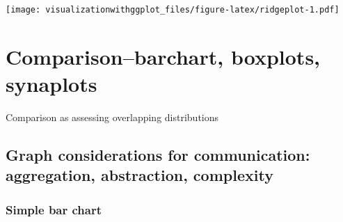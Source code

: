 \documentclass[]{krantz}
\makeatletter
\newenvironment{Shaded}{\begin{snugshade}}{\end{snugshade}}
\newcommand{\DataTypeTok}[1]{\textcolor[rgb]{0.13,0.29,0.53}{#1}}
\newcommand{\DecValTok}[1]{\textcolor[rgb]{0.00,0.00,0.81}{#1}}
\newcommand{\KeywordTok}[1]{\textcolor[rgb]{0.13,0.29,0.53}{\textbf{#1}}}
\newcommand{\NormalTok}[1]{#1}
\newcommand{\OperatorTok}[1]{\textcolor[rgb]{0.81,0.36,0.00}{\textbf{#1}}}
\newcommand{\StringTok}[1]{\textcolor[rgb]{0.31,0.60,0.02}{#1}}
\newenvironment{kframe}{%
\medskip{}
\setlength{\fboxsep}{.8em}
 \def\at@end@of@kframe{}%
 \ifinner\ifhmode%
  \def\at@end@of@kframe{\end{minipage}}%
  \begin{minipage}{\columnwidth}%
 \fi\fi%
 \def\FrameCommand##1{\hskip\@totalleftmargin \hskip-\fboxsep
 \colorbox{shadecolor}{##1}\hskip-\fboxsep
     \hskip-\linewidth \hskip-\@totalleftmargin \hskip\columnwidth}%
 \MakeFramed {\advance\hsize-\width
   \@totalleftmargin\z@ \linewidth\hsize
   \@setminipage}}%
 {\par\unskip\endMakeFramed%
 \at@end@of@kframe}
\renewenvironment{Shaded}{\begin{kframe}}{\end{kframe}}
\makeatother
\begin{document}
\texttt{[image: visualizationwithggplot\_files/figure-latex/ridgeplot-1.pdf]}

\cleardoublepage

\hypertarget{Comparison}{%
\chapter{Comparison--barchart, boxplots, synaplots}\label{Comparison}}

Comparison as assessing overlapping distributions

\hypertarget{graph-considerations-for-communication-aggregation-abstraction-complexity}{%
\section{Graph considerations for communication: aggregation, abstraction, complexity}\label{graph-considerations-for-communication-aggregation-abstraction-complexity}}

\hypertarget{simple-bar-chart}{%
\subsection{Simple bar chart}\label{simple-bar-chart}}

\begin{Shaded}
\end{Shaded}
\end{document}
